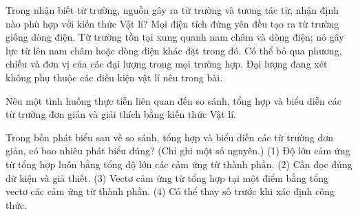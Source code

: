 \begin{ex}
Trong nhận biết từ trường, nguồn gây ra từ trường và tương tác từ, nhận định nào phù hợp với kiến thức Vật lí?
\choice
{Mọi điện tích đứng yên đều tạo ra từ trường giống dòng điện.}
{\True Từ trường tồn tại xung quanh nam châm và dòng điện; nó gây lực từ lên nam châm hoặc dòng điện khác đặt trong đó.}
{Có thể bỏ qua phương, chiều và đơn vị của các đại lượng trong mọi trường hợp.}
{Đại lượng đang xét không phụ thuộc các điều kiện vật lí nêu trong bài.}
\end{ex}

\begin{bt}
Nêu một tình huống thực tiễn liên quan đến so sánh, tổng hợp và biểu diễn các từ trường đơn giản và giải thích bằng kiến thức Vật lí.
\end{bt}

\begin{ex}
Trong bốn phát biểu sau về so sánh, tổng hợp và biểu diễn các từ trường đơn giản, có bao nhiêu phát biểu đúng? (Chỉ ghi một số nguyên.) (1) Độ lớn cảm ứng từ tổng hợp luôn bằng tổng độ lớn các cảm ứng từ thành phần. (2) Cần đọc đúng dữ kiện và giả thiết. (3) Vectơ cảm ứng từ tổng hợp tại một điểm bằng tổng vectơ các cảm ứng từ thành phần. (4) Có thể thay số trước khi xác định công thức.
\end{ex}

